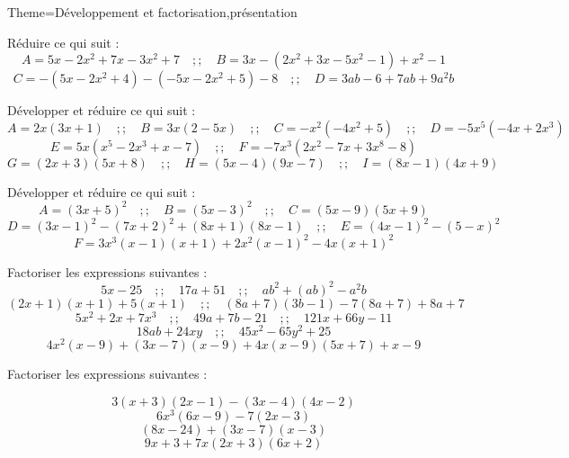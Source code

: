 \documentclass[a4paper,12pt]{article}
\begin{document}
\begin{Maquette}[Fiche]{Theme=Développement et factorisation,présentation}


\begin{exercice}
Réduire ce qui suit :
\[
A=5x-2x^{2}+7x-3x^{2}+7\quad ;; \quad
B=3x-(2x^{2}+3x-5x^{2}-1)+x^{2}-1
\]
\[
C=-(5x-2x^{2}+4)-(-5x-2x^{2}+5)-8\quad ;; \quad
D=3ab-6+7ab+9a^{2}b
\]
\end{exercice}

\begin{exercice}
Développer et réduire ce qui suit :
\[
A=2x(3x+1)\quad ;; \quad
B=3x(2-5x)\quad ;; \quad
C=-x^{2}(-4x^{2}+5)\quad ;; \quad
D=-5x^{5}(-4x+2x^{3})
\]
\[
E=5x(x^{5}-2x^{3}+x-7)\quad ;; \quad
F=-7x^{3}(2x^{2}-7x+3x^{8}-8)
\]
\[
G=(2x+3)(5x+8)\quad ;; \quad
H=(5x-4)(9x-7)\quad ;; \quad
I=(8x-1)(4x+9)
\]
\end{exercice}

\begin{exercice}
Développer et réduire ce qui suit :
\[
A=(3x+5)^{2}\quad ;; \quad
B=(5x-3)^{2}\quad ;; \quad
C=(5x-9)(5x+9)
\]
\[
D=(3x-1)^{2}-(7x+2)^{2}+(8x+1)(8x-1) \quad ;;\quad
E=(4x-1)^{2}-(5-x)^{2}
\]
\[
F=3x^{3}(x-1)(x+1)+2x^{2}(x-1)^{2}-4x(x+1)^{2}
\]
\end{exercice}

\begin{exercice}
Factoriser les expressions suivantes :
\[
5x-25\quad ;; \quad
17a+51\quad ;; \quad
ab^{2}+(ab)^{2}-a^{2}b
\]
\[
(2x+1)(x+1)+5(x+1)\quad ;; \quad
(8a+7)(3b-1)-7(8a+7)+8a+7
\]
\[
5x^{2}+2x+7x^{3}\quad ;; \quad
49a+7b-21\quad ;; \quad
121x+66y-11
\]
\[
18ab+24xy\quad ;; \quad
45x^{2}-65y^{2}+25
\]
\[
4x^{2}(x-9)+(3x-7)(x-9)+4x(x-9)(5x+7)+x-9
\]
\end{exercice}
\begin{exercice}
Factoriser les expressions suivantes :

$$3(x+3)(2x-1)-(3x-4)(4x-2) $$
$$6x^{3}(6x-9)-7(2x-3) $$
$$(8x-24)+(3x-7)(x-3) $$
$$9x+3+7x(2x+3)(6x+2)$$

\end{exercice}
\end{Maquette}
\end{document}
